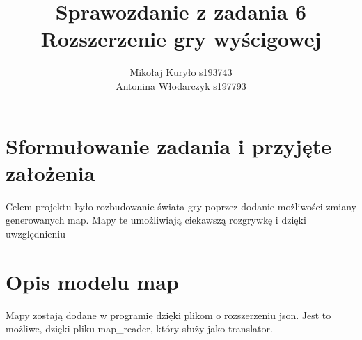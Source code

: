 \documentclass{article}
\title{Sprawozdanie z zadania 6\\\textbf{Rozszerzenie gry wyścigowej}}
\author{Mikołaj Kuryło s193743\\Antonina Włodarczyk s197793}
\date{}
\begin{document}
\maketitle
\vspace{1cm}

\section{Sformułowanie zadania i przyjęte założenia}
Celem projektu było rozbudowanie świata gry poprzez dodanie możliwości zmiany generowanych map.
Mapy te umożliwiają ciekawszą rozgrywkę i dzięki uwzględnieniu

\section{Opis modelu map}
Mapy zostają dodane w programie dzięki plikom o rozszerzeniu json.
Jest to możliwe, dzięki pliku map\_reader, który służy jako translator. 
\end{document}
